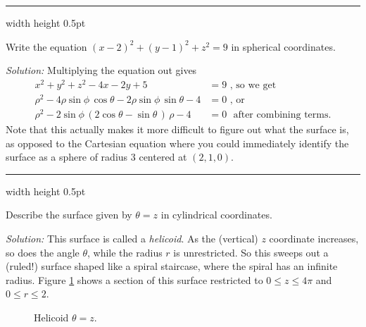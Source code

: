 \smallskip
\hrule width \textwidth height 0.5pt
\begin{exmp}
 Write the equation $(x - 2)^2 + (y - 1)^2 + z^2 = 9$ in spherical coordinates.\smallskip
 \par\noindent \emph{Solution:} Multiplying the equation out gives
 \begin{align*}
  x^2 + y^2 + z^2 - 4x - 2y + 5 &= 9 \text{~, so we get}\\
  \rho^2 - 4 \rho \sin \phi \,\cos \theta - 2 \rho \sin \phi \,\sin \theta - 4 &= 0 \text{~,~or}\\
  \rho^2 - 2 \sin \phi \, ( 2 \cos \theta - \sin \theta \, ) \,\rho - 4 &= 0\text{~~after combining terms.}
 \end{align*}
 Note that this actually makes it more difficult to figure out what the surface is,
 as opposed to the Cartesian equation where you could immediately identify the surface as a sphere of radius $3$ centered
 at $(2,1,0)$.
\end{exmp}
\hrule width \textwidth height 0.5pt
\begin{exmp}\label{exmp:helicoid}
 Describe the surface given by $\theta = z$ in cylindrical coordinates.\smallskip
 \par\noindent \emph{Solution:} This surface is called a \emph{helicoid}. 
 As the (vertical) $z$
 coordinate increases, so does the angle $\theta$, while the radius $r$ is unrestricted. 
 So this sweeps out a (ruled!)
 surface shaped like a spiral staircase, where the spiral has an infinite radius. 
 Figure \ref{fig:helicoid} shows a
 section of this surface restricted to $0 \le z \le 4\pi$ and $0 \le r \le 2$.

 \begin{figure}[h]
  \begin{center}
   
  \end{center}
 \caption[]{\quad Helicoid $\theta = z$.}
 \label{fig:helicoid}
 \end{figure}
\end{exmp}

